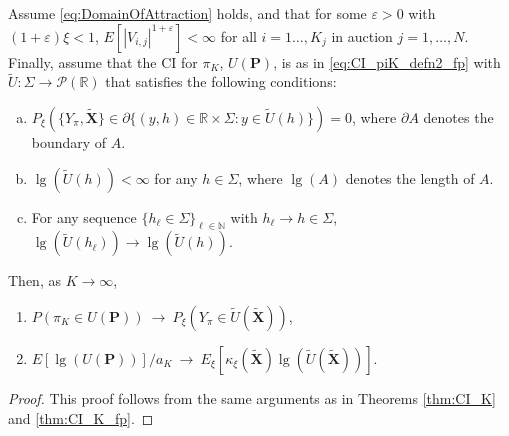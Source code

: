 \begin{theorem}\label{thm:CI_pi_K_fp}
Assume \eqref{eq:DomainOfAttraction} holds, and that for some $\varepsilon >0$ with $(1+\varepsilon)\xi<1$, $E[|V_{i,j}|^{1+\varepsilon}]<\infty $ for all $i=1\dots,K_j$ in auction $j=1,\dots,N$. Finally, assume that the CI for $\pi _{K}$, $U(\mathbf{P})$, is as in \eqref{eq:CI_piK_defn2_fp} with $\tilde{U}:\Sigma\to \mathcal{P}(\mathbb{R}) $ that satisfies the following conditions:
\begin{enumerate}[(a)]
\item $P_{\xi}(\{Y_{\pi},\mathbf{\tilde{X}}\}\in \partial \{(y,h)\in \mathbb{R} \times \Sigma:y\in \tilde{U}(h)\})=0$, where $\partial A$ denotes the boundary of $A$.
\item $\lg (\tilde{U}(h))<\infty $ for any $h\in \Sigma$, where $\lg (A)$ denotes the length of $A$.
\item For any sequence $\{h_{\ell}\in \Sigma\}_{\ell\in \mathbb{N}}$ with $ h_{\ell}\to h\in \Sigma$, $\lg (\tilde{U} (h_{\ell}))\to \lg (\tilde{U}(h))$.
\end{enumerate}
Then, as $K\to \infty $,
\begin{enumerate}
\item $P(\pi _{K}\in U(\mathbf{P}))~\to ~P_{\xi }(Y_{\pi }\in \tilde{ U}(\mathbf{\tilde{X}}))$,
\item $E[\lg (U(\mathbf{P}))]/a_{K}~\to ~E_{\xi }[\kappa _{\xi }( \mathbf{\tilde{X}})\lg (\tilde{U}(\mathbf{\tilde{X}}))]$.
\end{enumerate}
\end{theorem}
\begin{proof}
This proof follows from the same arguments as in Theorems \ref{thm:CI_K} and \ref{thm:CI_K_fp}.
\end{proof}


